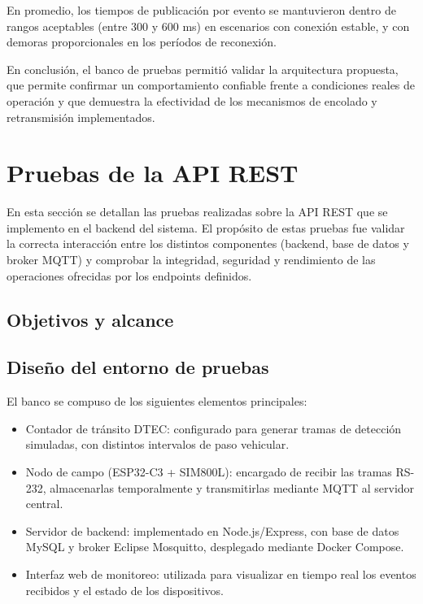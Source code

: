 En promedio, los tiempos de publicación por evento se mantuvieron dentro de rangos aceptables (entre 300 y 600 ms) en escenarios con conexión estable, y con demoras proporcionales en los períodos de reconexión.


En conclusión, el banco de pruebas permitió validar la arquitectura propuesta, que permite confirmar un comportamiento confiable frente a condiciones reales de operación y que demuestra la efectividad de los mecanismos de encolado y retransmisión implementados.

\section{Pruebas de la API REST}
\label{sec:pruebas-api}

En esta sección se detallan las pruebas realizadas sobre la API REST que se implemento en el backend del sistema. El propósito de estas pruebas fue validar la correcta interacción entre los distintos componentes (backend, base de datos y broker MQTT) y comprobar la integridad, seguridad y rendimiento de las operaciones ofrecidas por los endpoints definidos.  




\subsection{Objetivos y alcance}

\subsection{Diseño del entorno de pruebas}

El banco se compuso de los siguientes elementos principales:

\begin{itemize}
    \item Contador de tránsito DTEC: configurado para generar tramas de detección simuladas, con distintos intervalos de paso vehicular.
    \item Nodo de campo (ESP32-C3 + SIM800L): encargado de recibir las tramas RS-232, almacenarlas temporalmente y transmitirlas mediante MQTT al servidor central.
    \item Servidor de backend: implementado en Node.js/Express, con base de datos MySQL y broker Eclipse Mosquitto, desplegado mediante Docker Compose.
    \item Interfaz web de monitoreo: utilizada para visualizar en tiempo real los eventos recibidos y el estado de los dispositivos.
\end{itemize}


